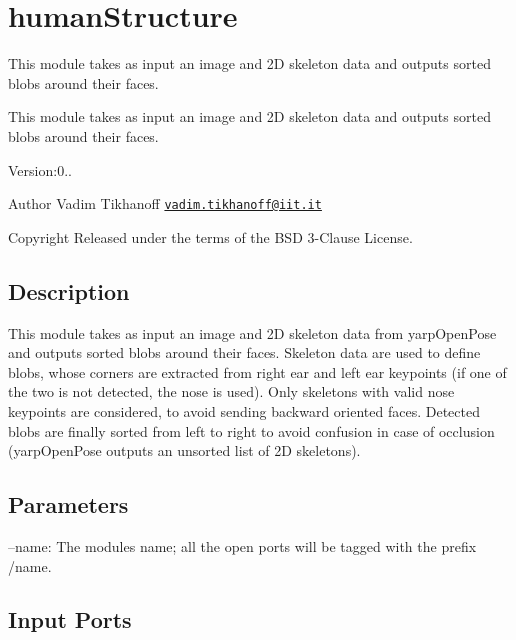 \section{human\+Structure}
\label{group__humanStructure}


This module takes as input an image and 2D skeleton data and outputs sorted blobs around their faces.  


This module takes as input an image and 2D skeleton data and outputs sorted blobs around their faces. 

Version\+:0.. \begin{DoxyAuthor}{Author}
Vadim Tikhanoff \href{mailto:vadim.tikhanoff@iit.it}{\tt vadim.\+tikhanoff@iit.\+it} ~\newline
 
\end{DoxyAuthor}
\begin{DoxyCopyright}{Copyright}
Released under the terms of the B\+SD 3-\/\+Clause License. 
\end{DoxyCopyright}
\hypertarget{group__skeletonViewer_intro_sec}{}\subsection{Description}\label{group__skeletonViewer_intro_sec}
This module takes as input an image and 2D skeleton data from yarp\+Open\+Pose and outputs sorted blobs around their faces. Skeleton data are used to define blobs, whose corners are extracted from right ear and left ear keypoints (if one of the two is not detected, the nose is used). Only skeletons with valid nose keypoints are considered, to avoid sending backward oriented faces. Detected blobs are finally sorted from left to right to avoid confusion in case of occlusion (yarp\+Open\+Pose outputs an unsorted list of 2D skeletons).\hypertarget{group__skeletonViewer_parameters_sec}{}\subsection{Parameters}\label{group__skeletonViewer_parameters_sec}

\begin{DoxyItemize}
\item --name\+: The module\textquotesingle{}s name; all the open ports will be tagged with the prefix /name. 
\end{DoxyItemize}\hypertarget{group__skeletonViewer_inputports_sec}{}\subsection{Input Ports}\label{group__skeletonViewer_inputports_sec}

